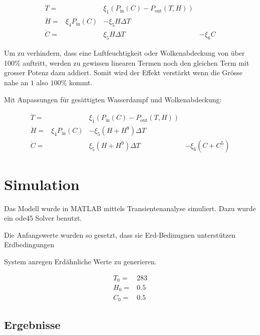 \begin{refsection}
\begin{equation}
\begin{matrix}
\dot{T} = &  & \xi_1 \left(P_{\text{in}}(C) - P_{\text{out}}(T, H) \right) &\\
\dot{H} = & \xi_4 P_{\text{in}}(C) & - \xi_5 H \Delta T & \\
\dot{C} = &                 &   \xi_5 H \Delta T & - \xi_6 C
\end{matrix}
\end{equation}

Um zu verhindern, dass eine Luftfeuchtigkeit oder Wolkenabdeckung von über 100\% auftritt, werden zu gewissen linearen Termen noch den gleichen Term mit grosser Potenz dazu addiert. Somit wird der Effekt verstärkt wenn die Grösse nahe an $1$ also $100\%$ kommt.  

Mit Anpassungen für gesättigten Wasserdampf und Wolkenabdeckung:

\begin{equation}
\begin{matrix}
\dot{T} = & & \xi_1 \left(P_{\text{in}}(C) - P_{\text{out}}(T, H) \right) &\\
\dot{H} = & \xi_4 P_{\text{in}}(C) & - \xi_5 (H + H^9) \Delta T & \\
\dot{C} = &                       &   \xi_5 (H + H^9) \Delta T & - \xi_6 (C + C^5)
\end{matrix}
\end{equation}


\section{Simulation}

Das Modell wurde in MATLAB mittels Transientenanalyse simuliert. Dazu wurde ein ode45 Solver benutzt.




Die Anfangswerte wurden so gesetzt, dass sie Erd-Bedinugnen unterstützen  
	Erdbedingungen
	
	System anregen Erdähnliche Werte zu generieren.

\begin{equation}
\begin{matrix}
T_0 = & 283 \\
H_0 = & 0.5 \\
C_0 = & 0.5
\end{matrix}
\end{equation}

\subsection{Ergebnisse}


\end{refsection}

